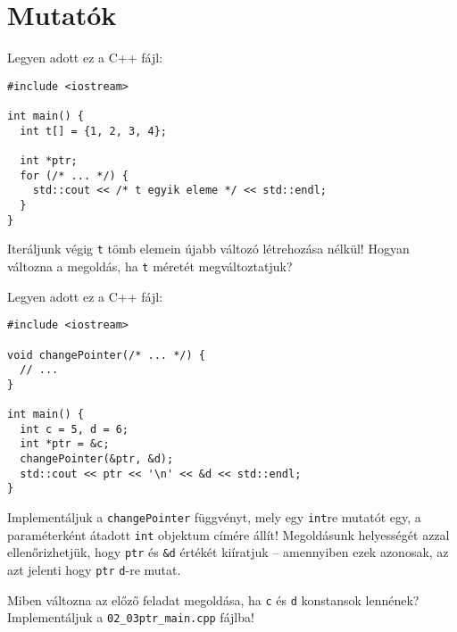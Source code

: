\documentclass[../exercise_book/exercise_book.tex]{subfiles}
\begin{document}
	\section{Mutatók}
	
	\begin{exercise}
		Legyen adott ez a C++ fájl:
		
		\smallskip
		\begin{lstlisting}
#include <iostream>

int main() {
  int t[] = {1, 2, 3, 4};

  int *ptr;
  for (/* ... */) {
    std::cout << /* t egyik eleme */ << std::endl;
  }
}
		\end{lstlisting}
		Iteráljunk végig \texttt{t} tömb elemein újabb változó létrehozása nélkül! Hogyan változna a megoldás, ha \texttt{t} méretét megváltoztatjuk?
	\end{exercise}
	\begin{exercise}
		Legyen adott ez a C++ fájl:
		
		\smallskip
		\fbox{\textbf{02\_02ptr\_main.cpp}}
		\begin{lstlisting}
#include <iostream>

void changePointer(/* ... */) {
  // ...
}

int main() {
  int c = 5, d = 6;
  int *ptr = &c;
  changePointer(&ptr, &d);
  std::cout << ptr << '\n' << &d << std::endl;
}
		\end{lstlisting}
		Implementáljuk a \texttt{changePointer} függvényt, mely egy \texttt{int}re mutatót egy, a paraméterként átadott \texttt{int} objektum címére állít! Megoldásunk helyességét azzal ellenőrizhetjük, hogy \texttt{ptr} és \texttt{\&d} értékét kiíratjuk -- amennyiben ezek azonosak, az azt jelenti hogy \texttt{ptr} \texttt{d}-re mutat.
	\end{exercise}
	\begin{exercise}
		Miben változna az előző feladat megoldása, ha \texttt{c} és \texttt{d} konstansok lennének? Implementáljuk a \texttt{02\_03ptr\_main.cpp} fájlba!
	\end{exercise}
\end{document}
